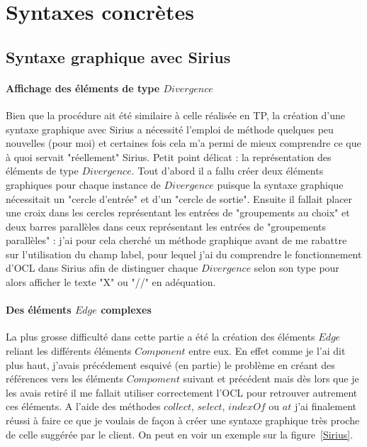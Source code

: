 \documentclass[12pt]{article}
\begin{document}
\section{Syntaxes concrètes}
\subsection{Syntaxe graphique avec Sirius}
\paragraph{Affichage des éléments de type $Divergence$}
Bien que la procédure ait été similaire à celle réalisée en TP, la création d'une syntaxe graphique avec Sirius a nécessité l'emploi de méthode quelques peu nouvelles (pour moi) et certaines fois cela m'a permi de mieux comprendre ce que à quoi servait "réellement" Sirius. Petit point délicat : la représentation des éléments de type $Divergence$. Tout d'abord il a fallu créer deux éléments graphiques pour chaque instance de $Divergence$ puisque la syntaxe graphique nécessitait un "cercle d'entrée" et d'un "cercle de sortie". Ensuite il fallait placer une croix dans les cercles représentant les entrées de "groupements au choix" et deux barres parallèles dans ceux représentant les entrées de "groupements parallèles" : j'ai pour cela cherché un méthode graphique avant de me rabattre sur l'utilisation du champ label, pour lequel j'ai du comprendre le fonctionnement d'OCL dans Sirius afin de distinguer chaque $Divergence$ selon son type pour alors afficher le texte "X" ou "//" en adéquation.

\paragraph{Des éléments $Edge$ complexes}
La plus grosse difficulté dans cette partie a été la création des éléments $Edge$ reliant les différents éléments $Component$ entre eux. En effet comme je l'ai dit plus haut, j'avais précédement esquivé (en partie) le problème en créant des références vers les éléments $Compoment$ suivant et précédent mais dès lors que je les avais retiré il me fallait utiliser correctement l'OCL pour retrouver autrement ces éléments. A l'aide des méthodes $collect$, $select$, $indexOf$ ou $at$ j'ai finalement réussi à faire ce que je voulais de façon à créer une syntaxe graphique très proche de celle suggérée par le client. On peut en voir un exemple sur la figure~\ref{Sirius}.
\end{document}
